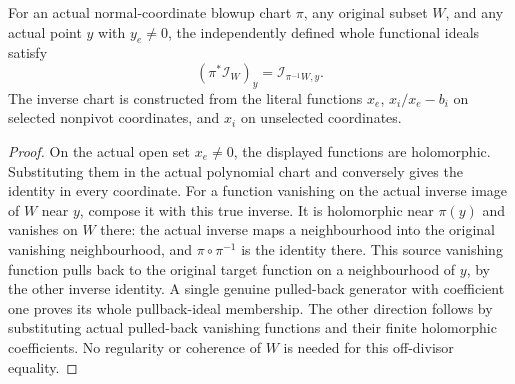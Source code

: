\begin{theorem}
\label{hir:actual-normal-blowup-off-divisor-whole-pullback}
\leanok
For an actual normal-coordinate blowup chart $\pi$, any original subset
$W$, and any actual point $y$ with $y_e\ne0$, the independently defined
whole functional ideals satisfy
\[
 (\pi^*\mathcal I_W)_y=\mathcal I_{\pi^{-1}W,y}.
\]
The inverse chart is constructed from the literal functions
$x_e$, $x_i/x_e-b_i$ on selected nonpivot coordinates, and $x_i$ on
unselected coordinates.
\end{theorem}
\begin{proof}
On the actual open set $x_e\ne0$, the displayed functions are holomorphic.
Substituting them in the actual polynomial chart and conversely gives
the identity in every coordinate. For a function vanishing on the actual
inverse image of $W$ near $y$, compose it with this true inverse. It is
holomorphic near $\pi(y)$ and vanishes on $W$ there: the actual inverse
maps a neighbourhood into the original vanishing neighbourhood, and
$\pi\circ\pi^{-1}$ is the identity there. This source vanishing function
pulls back to the original target function on a neighbourhood of $y$,
by the other inverse identity. A single genuine pulled-back generator
with coefficient one proves its whole pullback-ideal membership. The
other direction follows by substituting actual pulled-back vanishing
functions and their finite holomorphic coefficients. No regularity or
coherence of $W$ is needed for this off-divisor equality.
\end{proof}

